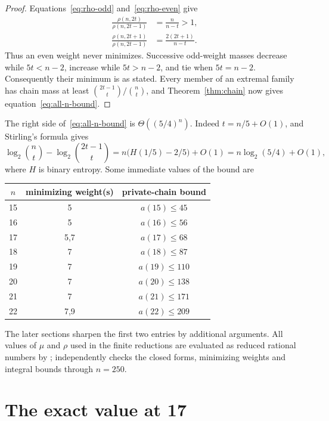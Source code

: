 \documentclass[11pt]{article}
\begin{document}
\begin{proof}
Equations~\eqref{eq:rho-odd} and~\eqref{eq:rho-even} give
\begin{align*}
 \frac{\rho(n,2t)}{\rho(n,2t-1)}&=\frac n{n-t}>1,\\
 \frac{\rho(n,2t+1)}{\rho(n,2t-1)}
 &=\frac{2(2t+1)}{n-t}.
\end{align*}
Thus an even weight never minimizes.  Successive odd-weight masses decrease
while $5t<n-2$, increase while $5t>n-2$, and tie when $5t=n-2$.
Consequently their minimum is as stated.  Every member of an extremal family
has chain mass at least
$\binom{2t-1}t/\binom nt$, and Theorem~\ref{thm:chain} now gives
equation~\eqref{eq:all-n-bound}.
\end{proof}

The right side of~\eqref{eq:all-n-bound} is
$\Theta((5/4)^n)$.  Indeed $t=n/5+O(1)$, and Stirling's formula gives
\[
 \log_2\binom nt-\log_2\binom{2t-1}t
 =n\bigl(H(1/5)-2/5\bigr)+O(1)
 =n\log_2(5/4)+O(1),
\]
where $H$ is binary entropy.  Some immediate values of the bound are
\begin{center}
\begin{tabular}{c@{\qquad}c@{\qquad}c}
\toprule
$n$ & minimizing weight(s) & private-chain bound \\
\midrule
15 & 5   & $a(15)\leq45$ \\
16 & 5   & $a(16)\leq56$ \\
17 & 5,7 & $a(17)\leq68$ \\
18 & 7   & $a(18)\leq87$ \\
19 & 7   & $a(19)\leq110$ \\
20 & 7   & $a(20)\leq138$ \\
21 & 7   & $a(21)\leq171$ \\
22 & 7,9 & $a(22)\leq209$ \\
\bottomrule
\end{tabular}
\end{center}
The later sections sharpen the first two entries by additional arguments.
All values of $\mu$ and $\rho$ used in the finite reductions are evaluated
as reduced rational numbers by ;
 independently checks the closed
forms, minimizing weights and integral bounds through $n=250$.

\section{The exact value at 17}
\end{document}
